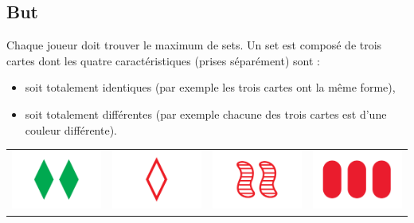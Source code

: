 \documentclass[a4paper,12pt,titlepage]{article}
\theoremstyle{plain}
\theoremstyle{definition}
\begin{document}
\subsection{But}
Chaque joueur doit trouver le maximum de sets. Un set est composé de trois cartes dont les quatre caractéristiques (prises séparément) sont : 
\begin{itemize}
\item soit totalement identiques (par exemple les trois cartes ont la même forme),
\item soit totalement différentes (par exemple chacune des trois cartes est d'une couleur différente).
\end{itemize}

\begin{table}[h]
  \centering
  \begin{tabular}{ c | c | c | c }
    \includegraphics[scale=0.2]{1012.png} &
    \includegraphics[scale=0.2]{0202.png} &
    \includegraphics[scale=0.2]{1101.png} &
    \includegraphics[scale=0.2]{2000.png} \\

\end{tabular}
\end{table}
\end{document}
